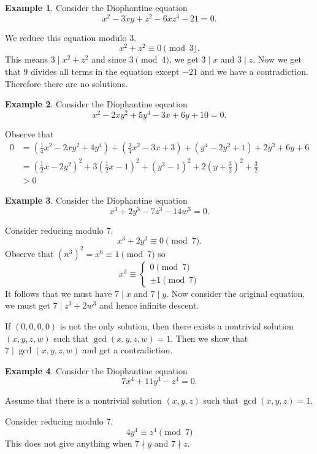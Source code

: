 \documentclass[11pt]{article}
\theoremstyle{definition}
\newtheorem{example}{Example}[section]
\begin{document}
\begin{example}
	Consider the Diophantine equation
	$$ x^2 - 3xy + z^2 - 6xz^3 - 21 = 0 . $$
\end{example}
\proof
	We reduce this equation modulo 3. 
	$$ x^2 + z^2 \equiv 0 \pmod{3} . $$
	This means $3\mid x^2 + z^2$ and since $3\pmod{4}$, we get $3\mid x$ and $3\mid z$. 
	Now we get that $9$ divides all terms in the equation except $-21$ and we have a contradiction. 
	Therefore there are no solutions.
\qedhere

\begin{example}
	Consider the Diophantine equation
	$$ x^2 - 2xy^2 + 5y^4 - 3x + 6y + 10 = 0 . $$
\end{example}
\proof
	Observe that 
	\begin{align*}
		0 &= \left( \frac{1}{4}x^2 - 2xy^2 + 4y^4 \right) + \left( \frac{3}{4}x^2 - 3x + 3 \right) + \left( y^4 - 2y^2 + 1 \right) + 2y^2 + 6y + 6 \\
		&= \left( \frac{1}{2}x - 2y^2 \right)^2 + 3\left( \frac{1}{2}x - 1 \right)^2 + \left( y^2 - 1 \right)^2 + 2\left( y + \frac{3}{2} \right)^2 + \frac{3}{2} \\
		&> 0
	\end{align*}
\qedhere

\begin{example}
	Consider the Diophantine equation
	$$ x^3 + 2y^3 - 7z^3 - 14w^3 = 0 . $$
\end{example}
\proof
	Consider reducing modulo $7$.
	$$ x^3 + 2y^3 \equiv 0 \pmod{7} . $$
	Observe that $(n^3)^2 = x^6 \equiv 1 \pmod{7}$ so
	\[
		x^3 \equiv \begin{cases}
			0 \pmod{7} \\
			\pm 1 \pmod{7}
		\end{cases}
	\]
	It follows that we must have $7\mid x$ and $7\mid y$. 
	Now consider the original equation, we must get $7\mid z^3 + 2w^3$ and hence infinite descent. 

	If $(0,0,0,0)$ is not the only solution, then there exists a nontrivial solution $(x,y,z,w)$ such that $\gcd(x,y,z,w) = 1$. 
	Then we show that $7 \mid \gcd(x,y,z,w)$ and get a contradiction. 
\qedhere

\begin{example}
	Consider the Diophantine equation
	$$ 7x^4 + 11y^4 - z^4 = 0 . $$
\end{example}
\proof
	Assume that there is a nontrivial solution $(x,y,z)$ such that $\gcd(x,y,z) = 1$. 

	Consider reducing modulo $7$. 
	$$ 4y^4 \equiv z^4 \pmod{7} $$
	This does not give anything when $7\nmid y$ and $7\nmid z$. 
\end{document}
